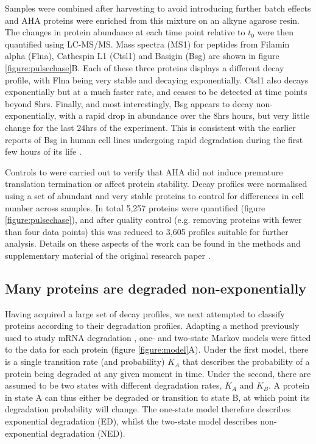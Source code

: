 \documentclass[a4paper,11pt,twoside,openright]{scrbook}
\begin{document}
Samples were combined after harvesting to avoid introducing further batch
effects and AHA proteins were enriched from this mixture on an alkyne agarose
resin. The changes in protein abundance at each time point relative to $t_{0}$
were then quantified using LC-MS/MS. Mass spectra (MS1) for peptides from
Filamin  alpha (Flna), Cathespin L1 (Ctsl1) and Basigin (Bsg) are shown in
figure \ref{figure:pulsechase}B. Each of these three proteins displays a
different decay profile, with Flna being very stable and decaying exponentially.
Ctsl1 also decays exponentially but at a much faster rate, and ceases to be
detected at time points beyond 8hrs. Finally, and most interestingly, Bsg
appears to decay non-exponentially, with a rapid drop in abundance over the 8hrs
hours, but very little change for the last 24hrs of the experiment. This is
consistent with the earlier reports of Bsg in human cell lines undergoing rapid
degradation during the first few hours of its life \cite{Tyler2012}.

Controls to were carried out to verify that AHA did not induce premature
translation termination or affect protein stability. Decay profiles were
normalised using a set of abundant and very stable proteins to control for
differences in cell number across samples. In total 5,257 proteins were
quantified (figure \ref{figure:pulsechase}), and after quality control (e.g.
removing proteins with fewer than four data points) this was reduced to 3,605
profiles suitable for further analysis. Details on these aspects of the work can
be found in the methods and supplementary material of the original research
paper \cite{McShane2016}.

\subsection{Many proteins are degraded non-exponentially}
Having acquired a large set of decay profiles, we next attempted to classify
proteins according to their degradation profiles. Adapting a method previously
used to study mRNA degradation \cite{Deneke2013}, one- and two-state Markov
models were fitted to the data for each protein (figure \ref{figure:model}A).
Under the first model, there is a single transition rate (and probability)
$K_{A}$ that describes the probability of a protein being degraded at any given
moment in time. Under the second, there are assumed to be two states with
different degradation rates, $K_{A}$ and $K_{B}$. A protein in state A can thus
either be degraded or transition to state B, at which point its degradation
probability will change. The one-state model therefore describes exponential
degradation (ED), whilst the two-state model describes non-exponential
degradation (NED).
\end{document}
